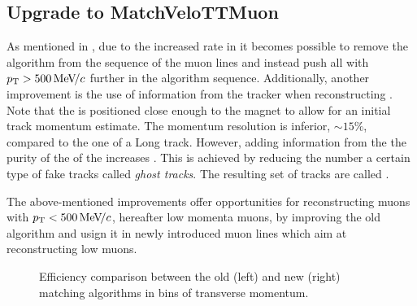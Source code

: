 \subsection{Upgrade to MatchVeloTTMuon}
\label{sec:matchvelottmuon}
As mentioned in , due to the increased \hltone rate in \runtwo it becomes possible to
remove the \mvm algorithm from the sequence of the \hltone muon lines and instead push all \veloTracks with
$\mbox{$p_{\rm T}$}>500 {\mathrm{\,Me\kern -0.1em V\!/}c}$ further in the algorithm sequence. Additionally, another improvement is the use of
information from the \ttracker tracker when reconstructing \veloTracks \cite{LHCb-PUB-2015-005}.
Note that the \ttracker is positioned close enough to the \lhcb magnet to allow for an initial track momentum estimate.
The \ttracker momentum resolution is inferior, $\sim 15\%$, compared to the one of a Long track.
However, adding information from the \ttracker the purity of the of the \veloTracks increases \cite{Bowen:2105078}.
This is achieved by reducing the number a certain type of fake tracks called {\it ghost tracks}.
The resulting set of tracks are called \veloTTracks.

The above-mentioned improvements offer opportunities for reconstructing muons with $\mbox{$p_{\rm T}$}<500 {\mathrm{\,Me\kern -0.1em V\!/}c}$,
hereafter low momenta muons, by improving the old \mvm algorithm and usign it in newly introduced
\hltone muon lines which aim at reconstructing low \pt muons.

\begin{figure}[t]
  \centering
  \begin{subfigure}{0.5\textwidth}
    \raggedright
    \scalebox{.6}{}
    \caption{}
    \label{mvTTm_eff_pt}
  \end{subfigure}%
  \hfill%
  \begin{subfigure}{0.5\textwidth}
    \raggedleft
    \scalebox{.6}{}
    \caption{}
    \label{mvm_eff_pt}
  \end{subfigure}
  \caption{Efficiency comparison between the old (left) and new (right) matching algorithms in bins of transverse momentum.}
 \label{mvm_eff_pt_zoom_comp}
\end{figure}

